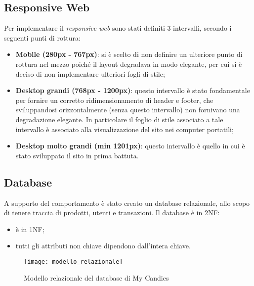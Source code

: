 \subsection{Responsive Web}
Per implementare il \textit{responsive web} sono stati definiti 3 intervalli, secondo i seguenti punti di rottura:
\begin{itemize}
    \item \textbf{Mobile (280px - 767px)}: si è scelto di non definire un ulteriore punto di rottura nel mezzo poiché  il layout degradava in modo elegante, per cui si è deciso di non implementare ulteriori fogli di stile;
    \item \textbf{Desktop grandi (768px - 1200px)}: questo intervallo è stato fondamentale per fornire un corretto ridimensionamento di header e footer, che sviluppandosi orizzontalmente (senza questo intervallo) non fornivano una degradazione elegante. In particolare il foglio di stile associato a tale intervallo è associato alla visualizzazione del sito nei computer portatili;
    \item \textbf{Desktop molto grandi (min 1201px)}: questo intervallo è quello in cui è stato sviluppato il sito in prima battuta. 
\end{itemize}

\subsection{Database}
A supporto del comportamento è stato creato un database relazionale, allo scopo di tenere traccia di prodotti, utenti e transazioni. Il database è in 2NF:
\begin{itemize}
    \item è in 1NF;
    \item tutti gli attributi non chiave dipendono dall'intera chiave.
\end{itemize}
\begin{figure}[H]
\centering
\texttt{[image: modello\_relazionale]}
\caption{Modello relazionale del database di My Candies} 
\end{figure}

